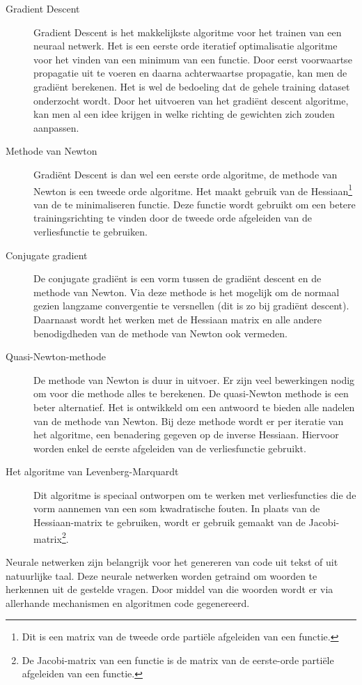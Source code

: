 \begin{description}
	\item[Gradient Descent] Gradient Descent is het makkelijkste algoritme voor het trainen van een neuraal netwerk. Het is een eerste orde iteratief optimalisatie algoritme voor het vinden van een minimum van een functie. Door eerst voorwaartse propagatie uit te voeren en daarna achterwaartse propagatie, kan men de gradiënt berekenen. Het is wel de bedoeling dat de gehele training dataset onderzocht wordt. Door het uitvoeren van het gradiënt descent algoritme, kan men al een idee krijgen in welke richting de gewichten zich zouden aanpassen.
	\item[Methode van Newton] Gradiënt Descent is dan wel een eerste orde algoritme, de methode van Newton is een tweede orde algoritme. Het maakt gebruik van de Hessiaan\footnote{Dit is een matrix van de tweede orde partiële afgeleiden van een functie.} van de te minimaliseren functie. Deze functie wordt gebruikt om een betere trainingsrichting te vinden door de tweede orde afgeleiden van de verliesfunctie te gebruiken.
	\item[Conjugate gradient] De conjugate gradiënt is een vorm tussen de gradiënt descent en de methode van Newton. Via deze methode is het mogelijk om de normaal gezien langzame convergentie te versnellen (dit is zo bij gradiënt descent). Daarnaast wordt het werken met de Hessiaan matrix en alle andere benodigdheden van de methode van Newton ook vermeden.
	\item[Quasi-Newton-methode] De methode van Newton is duur in uitvoer. Er zijn veel bewerkingen nodig om voor die methode alles te berekenen. De quasi-Newton methode is een beter alternatief. Het is ontwikkeld om een antwoord te bieden alle nadelen van de methode van Newton. Bij deze methode wordt er per iteratie van het algoritme, een benadering gegeven op de inverse Hessiaan. Hiervoor worden enkel de eerste afgeleiden van de verliesfunctie gebruikt.
	\item[Het algoritme van Levenberg-Marquardt] Dit algoritme is speciaal ontworpen om te werken met verliesfuncties die de vorm aannemen van een som kwadratische fouten. In plaats van de Hessiaan-matrix te gebruiken, wordt er gebruik gemaakt van de Jacobi-matrix\footnote{De Jacobi-matrix van een functie is de matrix van de eerste-orde partiële afgeleiden van een functie.}.
\end{description}

Neurale netwerken zijn belangrijk voor het genereren van code uit tekst of uit natuurlijke taal. Deze neurale netwerken worden getraind om woorden te herkennen uit de gestelde vragen. Door middel van die woorden wordt er via allerhande mechanismen en algoritmen code gegenereerd.
